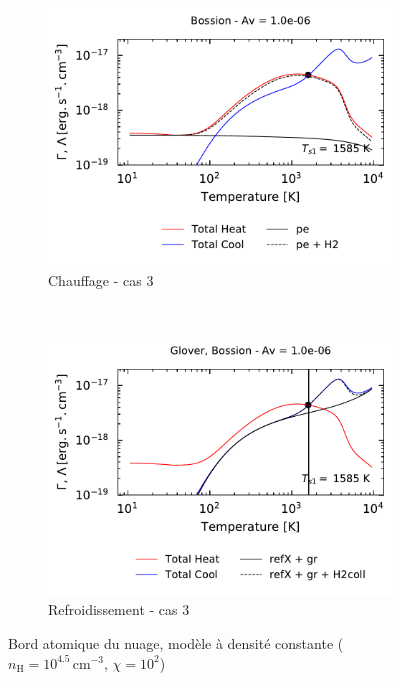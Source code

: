 \begin{figure}[!p]
    \begin{subfigure}[t]{0.49\textwidth} %
        \centering \includegraphics[trim = {0 0 0 1cm },clip,width=1\textwidth]{figure/H2/instabiliteH2/bossion/GC_h_1p0em06_pe_h2.pdf}
        \caption{Chauffage - cas 3}
    \end{subfigure}
    ~ 
    \begin{subfigure}[t]{0.49\textwidth}
        \centering \includegraphics[trim = {0 0 0 1cm },clip,width=1\textwidth]{figure/H2/instabiliteH2/bossion/GC_c_1p0em06_refx_gr_h2coll.pdf}
        \caption{Refroidissement - cas 3}
    \end{subfigure}
    \caption{Bord atomique du nuage, modèle à densité constante ($n_\mathrm{H} = 10^{4.5}\,\mathrm{cm}^{-3}$, $\chi = 10^2$)}
    \label{fig:H2:instab}
\end{figure}


